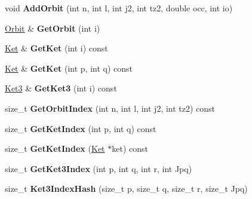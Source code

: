 \begin{DoxyCompactItemize}
\item 
\hypertarget{classModelSpace_a8bc32511dc8b05203c6352343a539a57}{void {\bfseries Add\-Orbit} (int n, int l, int j2, int tz2, double occ, int io)}\label{classModelSpace_a8bc32511dc8b05203c6352343a539a57}

\item 
\hypertarget{classModelSpace_af0723a47aa457b82fef436ce37a276f7}{\hyperlink{structOrbit}{Orbit} \& {\bfseries Get\-Orbit} (int i)}\label{classModelSpace_af0723a47aa457b82fef436ce37a276f7}

\item 
\hypertarget{classModelSpace_adc36e64fb3bb4dc76819f91e9057844f}{\hyperlink{structKet}{Ket} \& {\bfseries Get\-Ket} (int i) const }\label{classModelSpace_adc36e64fb3bb4dc76819f91e9057844f}

\item 
\hypertarget{classModelSpace_ab3662f5e12ce6da0164c8adbe1abbb95}{\hyperlink{structKet}{Ket} \& {\bfseries Get\-Ket} (int p, int q) const }\label{classModelSpace_ab3662f5e12ce6da0164c8adbe1abbb95}

\item 
\hypertarget{classModelSpace_a72e058dd8b81fb7e6c005dec7c64463c}{\hyperlink{structKet3}{Ket3} \& {\bfseries Get\-Ket3} (int i) const }\label{classModelSpace_a72e058dd8b81fb7e6c005dec7c64463c}

\item 
\hypertarget{classModelSpace_a8b0fe995ce5423223620c939141b54a4}{size\-\_\-t {\bfseries Get\-Orbit\-Index} (int n, int l, int j2, int tz2) const }\label{classModelSpace_a8b0fe995ce5423223620c939141b54a4}

\item 
\hypertarget{classModelSpace_a60c352dce617bd5565588a9a119405e8}{size\-\_\-t {\bfseries Get\-Ket\-Index} (int p, int q) const }\label{classModelSpace_a60c352dce617bd5565588a9a119405e8}

\item 
\hypertarget{classModelSpace_a276b905e588ddbca8d58d3744966d7b3}{size\-\_\-t {\bfseries Get\-Ket\-Index} (\hyperlink{structKet}{Ket} $\ast$ket) const }\label{classModelSpace_a276b905e588ddbca8d58d3744966d7b3}

\item 
\hypertarget{classModelSpace_ad79cce7833fbd728e5f76a897ac5309c}{size\-\_\-t {\bfseries Get\-Ket3\-Index} (int p, int q, int r, int Jpq)}\label{classModelSpace_ad79cce7833fbd728e5f76a897ac5309c}

\item 
\hypertarget{classModelSpace_a2c505ad636db66df3b46edd335c19f0b}{size\-\_\-t {\bfseries Ket3\-Index\-Hash} (size\-\_\-t p, size\-\_\-t q, size\-\_\-t r, size\-\_\-t Jpq)}\label{classModelSpace_a2c505ad636db66df3b46edd335c19f0b}


\end{DoxyCompactItemize}
